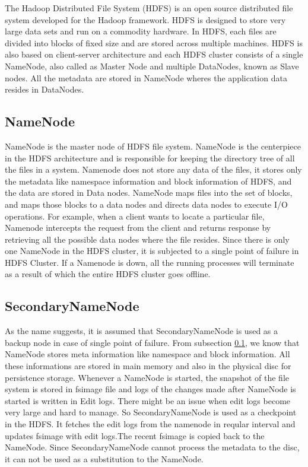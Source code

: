 \documentclass[11pt,a4paper,bibtotoc,idxtotoc,headsepline,footsepline,footexclude,BCOR12mm,DIV13]{scrbook}
\begin{document}
The Hadoop Distributed File System (HDFS) is an open source distributed file system developed for the Hadoop framework. HDFS is designed to store very large data sets and run on a commodity hardware. In HDFS, each files are divided into blocks of fixed size and are stored across multiple machines\cite{HDFS:architecture}. HDFS is also based on client-server architecture and each HDFS cluster consists of a single NameNode, also called as Master Node and multiple DataNodes, known as Slave nodes. All the metadata are stored in NameNode wheres the application data resides in DataNodes\cite{hadoop:architecture}.

\subsection{NameNode}
\label{NameNode}
NameNode is the master node of HDFS file system. NameNode is the centerpiece in the HDFS architecture and is responsible for keeping the directory tree of all the files in a system\cite{HDFS:namenodeanddatanode}. Namenode does not store any data of the files, it stores 
only the metadata like namespace information and block information of HDFS\cite{HDFS:namenodeanddatanode}, and the data are stored in Data nodes. NameNode maps files into the set of blocks, and maps those blocks to a data nodes and directs data nodes to execute I/O operations\cite{HDFS:namenodeanddatanode}. For example, when a client wants to locate a particular file, Namenode intercepts the request from the client and returns response by retrieving all the possible data nodes where the file resides. Since there is only one NameNode in the HDFS cluster, it is subjected to a single point of failure in HDFS Cluster. If a Namenode is down, all the running processes will terminate as a result of which the entire HDFS cluster goes offline\cite{HDFS:namenodeanddatanode}.  

\subsection{SecondaryNameNode}
\label{SecondaryNameNode}
As the name suggests, it is assumed that SecondaryNameNode is used as a backup node in case of single point of failure. From subsection \ref{NameNode}, we know that NameNode stores meta information like namespace and block information. All these informations are stored in main memory and also in the physical disc for persistence storage\cite{HDFS:secondarynamenode}. Whenever a NameNode is started, the snapshot of the file system is stored in fsimage file and logs of the changes made after NameNode is started is written in Edit logs. There might be an issue when edit logs become very large and hard to manage. So SecondaryNameNode is used as a checkpoint in the HDFS. It fetches the edit logs from the namenode in reqular interval and updates fsimage with edit logs.The recent fsimage is copied back to the NameNode\cite{HDFS:secondarynamenode}. Since SecondaryNameNode cannot process the metadata to the disc\cite{HDFS:architecture}, it can not be used as a substitution to the NameNode.
\end{document}
